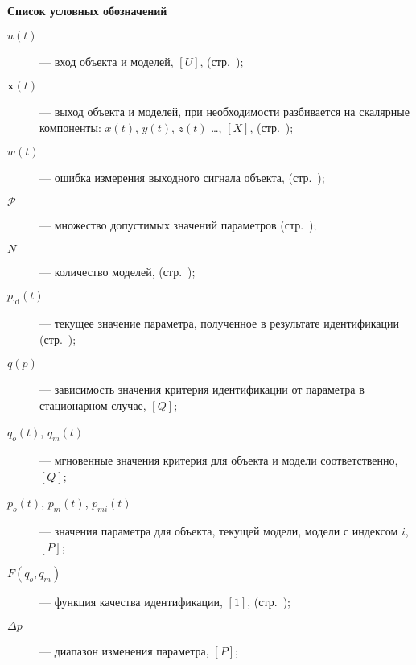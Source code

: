 \clearpage
{}

\begin{center}
  \textbf{Список условных обозначений}
\end{center}


\begin{description}

  \item[$u(t)$]  --- вход объекта и моделей, $[U]$, (стр.~\pageref{atu:d:u});

  \item[$\mathbf{x}(t)$]  --- выход объекта и моделей, при необходимости разбивается на скалярные компоненты:
    $x(t)$, $y(t)$, $z(t)$ \ldots, $[X]$, (стр.~\pageref{atu:d:x});

  \item[$w(t)$]  --- ошибка измерения выходного сигнала объекта, (стр.~\pageref{atu:d:w});

  \item[$\mathcal{P}$] --- множество допустимых значений параметров (стр.~\pageref{atu:d:p_set});

  \item[$N$]  --- количество моделей, (стр.~\pageref{atu:d:N});

  \item[$p_\mathrm{id}(t)$ ] --- текущее значение параметра, полученное в результате идентификации (стр.~\pageref{atu:d:p_id});

  \item[$q(p)$]  --- зависимость значения критерия идентификации от параметра в стационарном случае, $[Q]$;

  \item[$q_o(t)$, $q_m(t)$]  --- мгновенные значения критерия для объекта и модели соответственно, $[Q]$;

  \item[$p_o(t)$, $p_m(t)$, $p_{mi}(t)$]  --- значения параметра для объекта, текущей модели, модели с индексом $i$, $[P]$;

  \item[$F(q_o,q_m) $]  --- функция качества идентификации, $[1]$, (стр.~\pageref{atu:d:F});

  \item[$\Delta p$]  --- диапазон изменения параметра, $[P]$;


\end{description}
